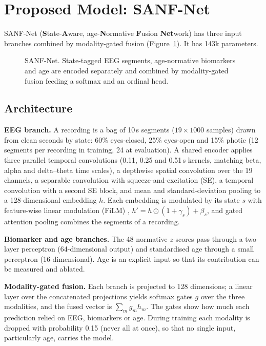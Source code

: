 \section{Proposed Model: SANF-Net}

SANF-Net (\textbf{S}tate-\textbf{A}ware, age-\textbf{N}ormative \textbf{F}usion \textbf{Net}work) has three input
branches combined by modality-gated fusion (Figure~\ref{fig:arch}). It has 143k parameters.

\begin{figure}[H]
\centering
\resizebox{0.85\textwidth}{!}{}
\caption{SANF-Net. State-tagged EEG segments, age-normative biomarkers and age are encoded separately and
combined by modality-gated fusion feeding a softmax and an ordinal head.}
\label{fig:arch}
\end{figure}

\subsection{Architecture}

\textbf{EEG branch.} A recording is a bag of 10\,s segments ($19 \times 1000$ samples) drawn from clean seconds
by state: 60\% eyes-closed, 25\% eyes-open and 15\% photic (12 segments per recording in training, 24 at
evaluation). A shared encoder applies three parallel temporal convolutions (0.11, 0.25 and 0.51\,s kernels,
matching beta, alpha and delta--theta time scales), a depthwise spatial convolution over the 19 channels, a
separable convolution with squeeze-and-excitation (SE), a temporal convolution with a second SE block, and
mean and standard-deviation pooling to a 128-dimensional embedding $h$. Each embedding is modulated by its
state $s$ with feature-wise linear modulation (FiLM) \citep{perez2018film}, $h' = h\odot(1+\gamma_s)+\beta_s$,
and gated attention pooling \citep{ilse2018attention} combines the segments of a recording.

\textbf{Biomarker and age branches.} The 48 normative $z$-scores pass through a two-layer perceptron
(64-dimensional output) and standardised age through a small perceptron (16-dimensional). Age is an explicit
input so that its contribution can be measured and ablated.

\textbf{Modality-gated fusion.} Each branch is projected to 128 dimensions; a linear layer over the
concatenated projections yields softmax gates $g$ over the three modalities, and the fused vector is
$\sum_m g_m h_m$. The gates show how much each prediction relied on EEG, biomarkers or age. During training
each modality is dropped with probability 0.15 (never all at once), so that no single input, particularly age,
carries the model.

